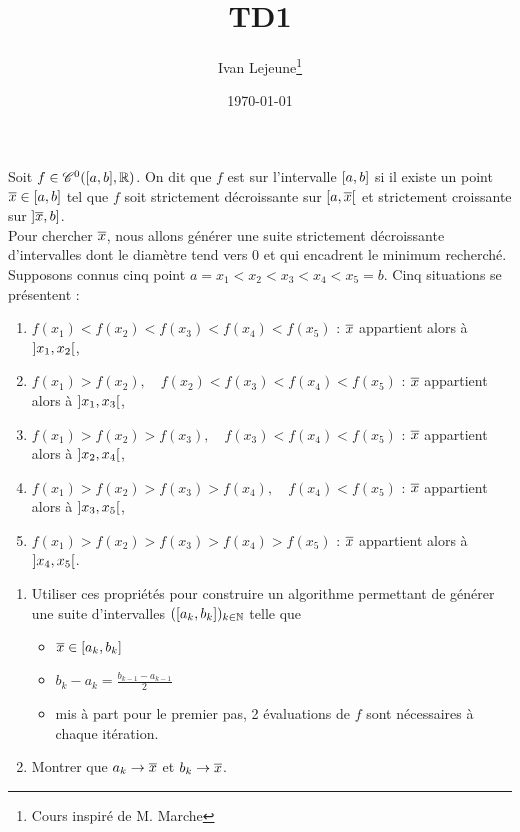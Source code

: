 \documentclass[french,a4paper,10pt]{article}
\title{\color{astral} \sffamily \bfseries TD1}
\author{Ivan Lejeune\thanks{Cours inspiré de M. Marche}}
\date{\today}
\begin{document}
	\maketitle
	\begin{td-exo}
		Soit $f\in\mathscr{C}^0(\mathopen{[}a,b\mathclose{]},\mathbb{R})$. On dit que $f$ est  sur l'intervalle $\mathopen{[}a,b\mathclose{]}$ si il existe un point $\overline{x}\in\mathopen{[}a,b\mathclose{]}$ tel que $f$ soit strictement décroissante sur $\mathopen{[}a,\overline{x}\mathclose{[}$ et strictement croissante sur $\mathopen{]}\overline{x}, b\mathclose{]}$.\\
		
		Pour chercher $\overline{x}$, nous allons générer une suite strictement décroissante d'intervalles dont le diamètre tend vers 0 et qui encadrent le minimum recherché.\\
		
		Supposons connus cinq point $a=x_1<x_2<x_3<x_4<x_5=b$. Cinq situations se présentent :
			\begin{enumerate}[label=$(\roman*)$]
				\item $f(x_1)<f(x_2)<f(x_3)<f(x_4)<f(x_5)$ : $\overline{x}$ appartient alors à $\mathopen{]}x_1,x_2\mathclose{[}$,
				
				\item $f(x_1)>f(x_2),\quad f(x_2)<f(x_3)<f(x_4)<f(x_5)$ : $\overline{x}$ appartient alors à $\mathopen{]}x_1,x_3\mathclose{[}$,
				
				\item $f(x_1)>f(x_2)>f(x_3),\quad f(x_3)<f(x_4)<f(x_5)$ : $\overline{x}$ appartient alors à $\mathopen{]}x_2,x_4\mathclose{[}$,
				
				\item $f(x_1)>f(x_2)>f(x_3)>f(x_4),\quad f(x_4)<f(x_5)$ : $\overline{x}$ appartient alors à $\mathopen{]}x_3,x_5\mathclose{[}$,
				
				\item $f(x_1)>f(x_2)>f(x_3)>f(x_4)>f(x_5)$ : $\overline{x}$ appartient alors à $\mathopen{]}x_4,x_5\mathclose{[}$.
			\end{enumerate}
		\begin{enumerate}
			\item Utiliser ces propriétés pour construire un algorithme permettant de générer une suite d'intervalles $(\mathopen{[}a_k,b_k\mathclose{]})_{k\in\mathbb{N}}$ telle que
				\begin{itemize}
					\item $\overline{x}\in\mathopen{[}a_k,b_k\mathclose{]}$
					
					\item $b_k-a_k=\frac{b_{k-1}-a_{k-1}}2$
					
					\item mis à part pour le premier pas, 2 évaluations de $f$ sont nécessaires à chaque itération.
				\end{itemize}
			\item Montrer que $a_k\to\overline{x}$ et $b_k\to \overline{x}$.
		\end{enumerate}
	\end{td-exo}
	
\end{document}
